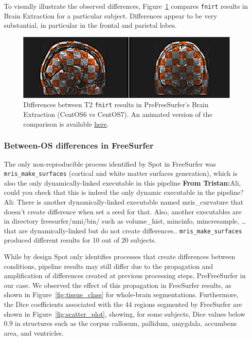 \documentclass[a4paper,num-refs]{oup-contemporary}
\newcommand{\tristan}[1]{\color{blue}\textbf{From Tristan:}#1\color{black}}
\newcommand{\toolname}[0]{Spot\xspace}
\newcommand{\fnirt}[0]{\texttt{fnirt}\xspace}
\begin{document}
To visually illustrate the observed differences,
Figure~\ref{fig:fnirt_result} compares \fnirt results in Brain Extraction
for a particular subject. Differences appear to be very substantial, in
particular in the frontal and parietal lobes. 
\begin{figure}
  \centering
    \includegraphics[width=\columnwidth]{images/t2w_alignment.png} 
    \caption{Differences between T2 \fnirt results in PreFreeSurfer's Brain Extraction (CentOS6 vs 
    CentOS7). An animated version of the comparison is available 
    \href{https://github.com/big-data-lab-team/HCP-reproducibility-paper/blob/master/images/pfs_t2w_alignment.gif}
    {here}.
} 
    \label{fig:fnirt_result}
\end{figure}


\subsubsection{Between-OS differences in FreeSurfer} 

The only non-reproducible process identified by \toolname in FreeSurfer was
\texttt{mris\_make\_surfaces} (cortical and white matter surfaces
generation), which is also the only dynamically-linked executable in this pipeline
\tristan{Ali, could you check that this is indeed the only dynamic
executable in the pipeline?
Ali: There is another dynamically-linked executable named mris\_curvature 
that doesn't create difference when set a seed for that.
Also, another executables are in directory freesurfer/mni/bin/ such as volume\_hist, 
mincinfo, mincresample, \dots
that are dynamically-linked but do not create differences.}. 
\texttt{mris\_make\_surfaces} produced different results for
10 out of 20 subjects. 

While by design \toolname only identifies processes that create differences
between conditions, pipeline results may still differ due to the
propagation and amplification of differences created at previous processing
steps, PreFreeSurfer in our case. We observed the effect of this
propagation in FreeSurfer results, as shown in
Figure~\ref{fig:tissue_class} for whole-brain segmentations. Furthermore,
the Dice coefficients associated with the 44 regions segmented by
FreeSurfer are shown in Figure~\ref{fig:scatter_plot}, showing, for some subjects, Dice values
below 0.9 in structures such as the corpus callosum, pallidum, amygdala,
accumbens area, and ventricles.
\end{document}
